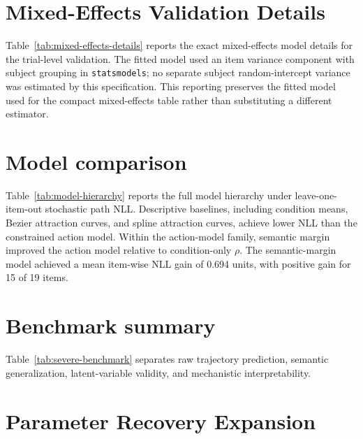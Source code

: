 \documentclass[11pt,final]{article}
\begin{document}


\section{Mixed-Effects Validation Details}
\label{sec:supp-mixed-effects}

Table~\ref{tab:mixed-effects-details} reports the exact mixed-effects model details for the trial-level validation. The fitted model used an item variance component with subject grouping in \texttt{statsmodels}; no separate subject random-intercept variance was estimated by this specification. This reporting preserves the fitted model used for the compact mixed-effects table rather than substituting a different estimator.



\section{Model comparison}
\label{sec:supp-model-hierarchy}

Table~\ref{tab:model-hierarchy} reports the full model hierarchy under leave-one-item-out stochastic path NLL. Descriptive baselines, including condition means, Bezier attraction curves, and spline attraction curves, achieve lower NLL than the constrained action model. Within the action-model family, semantic margin improved the action model relative to condition-only $\rho$. The semantic-margin model achieved a mean item-wise NLL gain of 0.694 units, with positive gain for 15 of 19 items.



\section{Benchmark summary}
\label{sec:supp-severe-benchmark}

Table~\ref{tab:severe-benchmark} separates raw trajectory prediction, semantic generalization, latent-variable validity, and mechanistic interpretability.



\section{Parameter Recovery Expansion}
\label{sec:supp-recovery}
\end{document}
